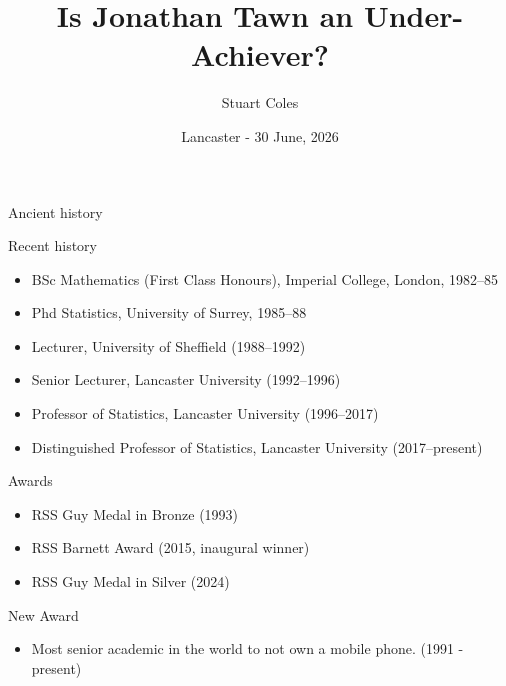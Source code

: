 \documentclass[
  ignorenonframetext,
]{beamer}
\title{\texorpdfstring{Is Jonathan Tawn an
Under-Achiever?}{Is Jonathan Tawn an Under-Achiever?}}
\author{\texorpdfstring{Stuart Coles}{Stuart Coles}}
\date{Lancaster - 30 June, 2026}
\providecommand{\tightlist}{%
  \setlength{\itemsep}{0pt}\setlength{\parskip}{0pt}}
\begin{document}
\frame{\titlepage}

\begin{frame}{Ancient history}
\protect{}\label{ancient-history}

\vspace {0.5cm}
\centering

\end{frame}

\begin{frame}{Recent history}
\protect{}\label{recent-history}
\begin{itemize}
\item
  BSc Mathematics (First Class Honours), Imperial College, London,
  1982--85
\item
  Phd Statistics, University of Surrey, 1985--88
\item
  Lecturer, University of Sheffield (1988--1992)
\item
  Senior Lecturer, Lancaster University (1992--1996)
\item
  Professor of Statistics, Lancaster University (1996--2017)
\item
  Distinguished Professor of Statistics, Lancaster University
  (2017--present)
\end{itemize}
\end{frame}

\begin{frame}{Awards}
\protect{}\label{awards}
\begin{itemize}
\item
  RSS Guy Medal in Bronze (1993)
\item
  RSS Barnett Award (2015, inaugural winner)
\item
  RSS Guy Medal in Silver (2024)
\end{itemize}
\end{frame}

\begin{frame}{New Award}
\protect{}\label{new-award}
\vspace{-2cm}
\begin{Huge}
\color[RGB]{255,215,0}\faTrophy
\end{Huge}

\pause

\vspace{1cm}

\begin{itemize}
\tightlist
\item
  Most senior academic in the world to not own a mobile phone. (1991 -
  present)
\end{itemize}
\end{frame}
\end{document}
